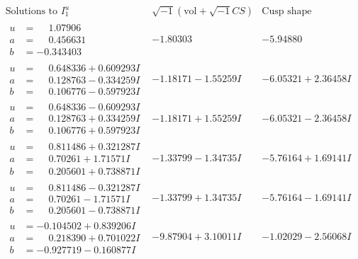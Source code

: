 \documentclass[1p]{elsarticle_modified}
\theoremstyle{definition}
\newcommand{\I}{\sqrt{-1}}
\begin{document}
$$\begin{array}{c|c|c}  
\text{Solutions to }I^u_{1}& \I (\text{vol} + \sqrt{-1}CS) & \text{Cusp shape}\\
 \hline 
\begin{aligned}
u &= \phantom{-}1.07906\phantom{ +0.000000I} \\
a &= \phantom{-}0.456631\phantom{ +0.000000I} \\
b &= -0.343403\phantom{ +0.000000I}\end{aligned}
 & -1.80303\phantom{ +0.000000I} & -5.94880\phantom{ +0.000000I} \\ \hline\begin{aligned}
u &= \phantom{-}0.648336 + 0.609293 I \\
a &= \phantom{-}0.128763 - 0.334259 I \\
b &= \phantom{-}0.106776 - 0.597923 I\end{aligned}
 & -1.18171 - 1.55259 I & -6.05321 + 2.36458 I \\ \hline\begin{aligned}
u &= \phantom{-}0.648336 - 0.609293 I \\
a &= \phantom{-}0.128763 + 0.334259 I \\
b &= \phantom{-}0.106776 + 0.597923 I\end{aligned}
 & -1.18171 + 1.55259 I & -6.05321 - 2.36458 I \\ \hline\begin{aligned}
u &= \phantom{-}0.811486 + 0.321287 I \\
a &= \phantom{-}0.70261 + 1.71571 I \\
b &= \phantom{-}0.205601 + 0.738871 I\end{aligned}
 & -1.33799 - 1.34735 I & -5.76164 + 1.69141 I \\ \hline\begin{aligned}
u &= \phantom{-}0.811486 - 0.321287 I \\
a &= \phantom{-}0.70261 - 1.71571 I \\
b &= \phantom{-}0.205601 - 0.738871 I\end{aligned}
 & -1.33799 + 1.34735 I & -5.76164 - 1.69141 I \\ \hline\begin{aligned}
u &= -0.104502 + 0.839206 I \\
a &= \phantom{-}0.218390 + 0.701022 I \\
b &= -0.927719 - 0.160877 I\end{aligned}
 & -9.87904 + 3.10011 I & -1.02029 - 2.56068 I \\ \hline\begin{aligned}

\end{aligned}
\end{array}$$
\end{document}
